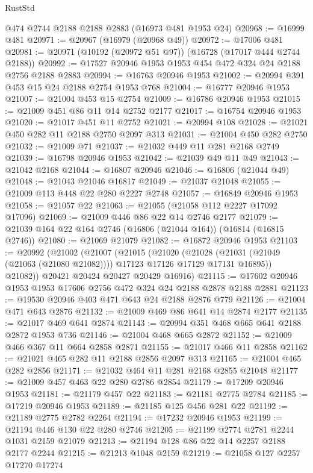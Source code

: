 \begin{lexlean}{RustStd}
\begin{coremodule}
    @474
    @2744
    @2188
    @2188
    @2883
    (@16973 @481 @1953 @24)
@20968 := @16999 @481
@20971 := @20967 (@16979 (@20968 @49))
@20972 := @17006 @481
@20981 := @20971 (@10192 (@20972 @51 @97)) (@16728 (@17017 @444 @2744 @2188))
@20992 := @17527 @20946 @1953 @1953 @454 @472 @324 @24 @2188 @2756 @2188 @2883
@20994 := @16763 @20946 @1953
@21002 := @20994 @391 @453 @15 @24 @2188 @2754 @1953 @768
@21004 := @16777 @20946 @1953
@21007 := @21004 @453 @15 @2754
@21009 := @16786 @20946 @1953
@21015 := @21009 @451 @86 @11 @14 @2752 @2177
@21017 := @16754 @20946 @1953
@21020 := @21017 @451 @11 @2752
@21021 := @20994 @108
@21028 := @21021 @450 @282 @11 @2188 @2750 @2097 @313
@21031 := @21004 @450 @282 @2750
@21032 := @21009 @71
@21037 := @21032 @449 @11 @281 @2168 @2749
@21039 := @16798 @20946 @1953
@21042 := @21039 @49 @11 @49
@21043 := @21042 @2168
@21044 := @16807 @20946
@21046 := @16806 (@21044 @49)
@21048 := @21043 @21046 @16817
@21049 := @21037 @21048
@21055 := @21009 @113 @448 @22 @280 @2227 @2748
@21057 := @16849 @20946 @1953
@21058 := @21057 @22
@21063 := @21055 (@21058 @112 @2227 @17092 @17096)
@21069 := @21009 @446 @86 @22 @14 @2746 @2177
@21079 := @21039 @164 @22 @164 @2746 (@16806 (@21044 @164)) (@16814 (@16815 @2746))
@21080 := @21069 @21079
@21082 := @16872 @20946 @1953
@21103 := @20992
    (@21002
      (@21007
        (@21015
          (@21020
            (@21028 (@21031 (@21049 (@21063 (@21080 @21082)))) @17123 @17126 @17129 @17131 @16895))
          @21082))
      @20421
      @20424
      @20427
      @20429
      @16916)
@21115 := @17602 @20946 @1953 @1953 @17606 @2756 @472 @324 @24 @2188 @2878 @2188 @2881
@21123 := @19530 @20946 @403 @471 @643 @24 @2188 @2876 @779
@21126 := @21004 @471 @643 @2876
@21132 := @21009 @469 @86 @641 @14 @2874 @2177
@21135 := @21017 @469 @641 @2874
@21143 := @20994 @351 @468 @665 @641 @2188 @2872 @1953 @736
@21146 := @21004 @468 @665 @2872
@21152 := @21009 @466 @367 @11 @664 @2858 @2871
@21155 := @21017 @466 @11 @2858
@21162 := @21021 @465 @282 @11 @2188 @2856 @2097 @313
@21165 := @21004 @465 @282 @2856
@21171 := @21032 @464 @11 @281 @2168 @2855 @21048
@21177 := @21009 @457 @463 @22 @280 @2786 @2854
@21179 := @17209 @20946 @1953
@21181 := @21179 @457 @22
@21183 := @21181 @2775 @2784
@21185 := @17219 @20946 @1953
@21189 := @21185 @125 @456 @281 @22
@21192 := @21189 @2775 @2782 @2264
@21194 := @17232 @20946 @1953
@21199 := @21194 @446 @130 @22 @280 @2746
@21205 := @21199 @2774 @2781 @2244 @1031 @2159 @21079
@21213 := @21194 @128 @86 @22 @14 @2257 @2188 @2177 @2244
@21215 := @21213 @1048 @2159
@21219 := @21058 @127 @2257 @17270 @17274

\end{coremodule}
\end{lexlean}
